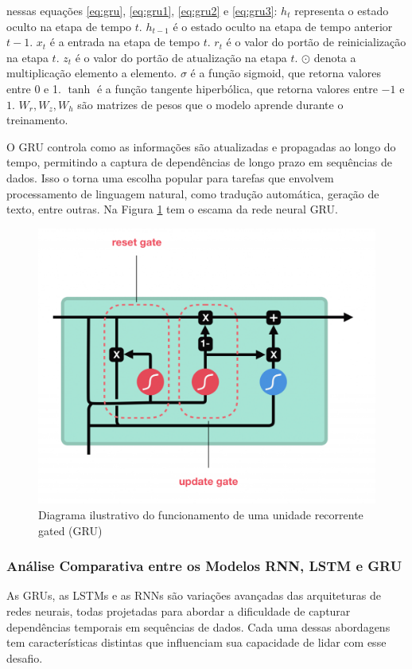 \noindent nessas equações \eqref{eq:gru}, \eqref{eq:gru1}, \eqref{eq:gru2} e \eqref{eq:gru3}:
 \( h_t \) representa o estado oculto na etapa de tempo \( t \). \( h_{t-1} \) é o estado oculto na etapa de tempo anterior \( t-1 \). \( x_t \) é a entrada na etapa de tempo \( t \). \( r_t \) é o valor do portão de reinicialização na etapa \( t \). \( z_t \) é o valor do portão de atualização na etapa \( t \). \( \odot \) denota a multiplicação elemento a elemento. \( \sigma \) é a função sigmoid, que retorna valores entre 0 e 1. \( \tanh \) é a função tangente hiperbólica, que retorna valores entre $-1$ e $1$. \( W_r, W_z, W_h \) são matrizes de pesos que o modelo aprende durante o treinamento.

O GRU controla como as informações são atualizadas e propagadas ao longo do tempo, permitindo a captura de dependências de longo prazo em sequências de dados. Isso o torna uma escolha popular para tarefas que envolvem processamento de linguagem natural, como tradução automática, geração de texto, entre outras.
Na Figura \ref{fig:gru4-1024x835} tem o escama da rede neural GRU.

\begin{figure}[H]
	\centering
	\caption{Diagrama ilustrativo do funcionamento de uma unidade recorrente gated (GRU)}
	\label{fig:gru4-1024x835}
	\includegraphics[width=0.5\linewidth]{Apendices/Figuras/modelagem-24h/gru4-1024x835}
	
\end{figure}



\subsubsection{An\'alise Comparativa entre os Modelos RNN, LSTM e GRU}

As GRUs, as LSTMs e as RNNs são variações avançadas das arquiteturas de redes neurais, todas projetadas para abordar a dificuldade de capturar dependências temporais em sequências de dados. Cada uma dessas abordagens tem características distintas que influenciam sua capacidade de lidar com esse desafio.

